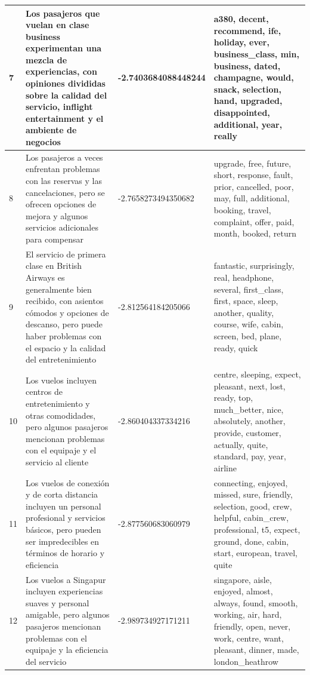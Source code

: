 \documentclass{report}
\begin{document}
\begin{longtable}{|p{1cm}|p{4cm}|p{4cm}|p{6cm}|}
                    \hline
                    7 & Los pasajeros que vuelan en clase business experimentan una mezcla de experiencias, con opiniones divididas sobre la calidad del servicio, inflight entertainment y el ambiente de negocios & -2.7403684088448244 & a380, decent, recommend, ife, holiday, ever, business\_class, min, business, dated, champagne, would, snack, selection, hand, upgraded, disappointed, additional, year, really \\
                    \hline
                    8 & Los pasajeros a veces enfrentan problemas con las reservas y las cancelaciones, pero se ofrecen opciones de mejora y algunos servicios adicionales para compensar & -2.7658273494350682 & upgrade, free, future, short, response, fault, prior, cancelled, poor, may, full, additional, booking, travel, complaint, offer, paid, month, booked, return \\
                    \hline
                    9 & El servicio de primera clase en British Airways es generalmente bien recibido, con asientos cómodos y opciones de descanso, pero puede haber problemas con el espacio y la calidad del entretenimiento & -2.812564184205066 & fantastic, surprisingly, real, headphone, several, first\_class, first, space, sleep, another, quality, course, wife, cabin, screen, bed, plane, ready, quick \\
                    \hline
                    10 & Los vuelos incluyen centros de entretenimiento y otras comodidades, pero algunos pasajeros mencionan problemas con el equipaje y el servicio al cliente & -2.860404337334216 & centre, sleeping, expect, pleasant, next, lost, ready, top, much\_better, nice, absolutely, another, provide, customer, actually, quite, standard, pay, year, airline \\
                    \hline
                    11 & Los vuelos de conexión y de corta distancia incluyen un personal profesional y servicios básicos, pero pueden ser impredecibles en términos de horario y eficiencia & -2.877560683060979 & connecting, enjoyed, missed, sure, friendly, selection, good, crew, helpful, cabin\_crew, professional, t5, expect, ground, done, cabin, start, european, travel, quite \\
                    \hline
                    12 & Los vuelos a Singapur incluyen experiencias suaves y personal amigable, pero algunos pasajeros mencionan problemas con el equipaje y la eficiencia del servicio & -2.989734927171211 & singapore, aisle, enjoyed, almost, always, found, smooth, working, air, hard, friendly, open, never, work, centre, want, pleasant, dinner, made, london\_heathrow \\

\end{longtable}
\end{document}
